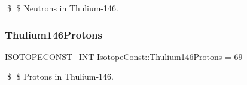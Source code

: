 \$ \$ Neutrons in Thulium-\/146. \mbox{\label{group___isotope_const-_thulium-_tm146_ga748d540ae227454e1adff7b1fce7e66f}} 
\subsubsection{\texorpdfstring{Thulium146\+Protons}{Thulium146Protons}}
{\footnotesize\ttfamily \mbox{\hyperlink{group___isotope_const-_macros_ga5f18360b3e99483a35c32d789e62621c}{I\+S\+O\+T\+O\+P\+E\+C\+O\+N\+S\+T\+\_\+\+I\+NT}} Isotope\+Const\+::\+Thulium146\+Protons = 69}

\$ \$ Protons in Thulium-\/146. 